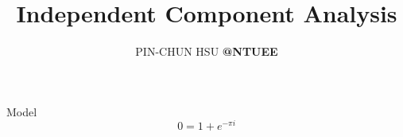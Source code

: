 \documentclass{beamer}
\author[b03901023@ntu.edu.tw]{ PIN-CHUN HSU \textbf{ @NTUEE } }
\title[Independent Component Analysis]{Independent Component Analysis}
\begin{document}
\frame{\titlepage}

\begin{frame}[fragile]{Model}
  \[
  0 = 1 + e^{-\pi i}
  \]
\end{frame}
\end{document}
